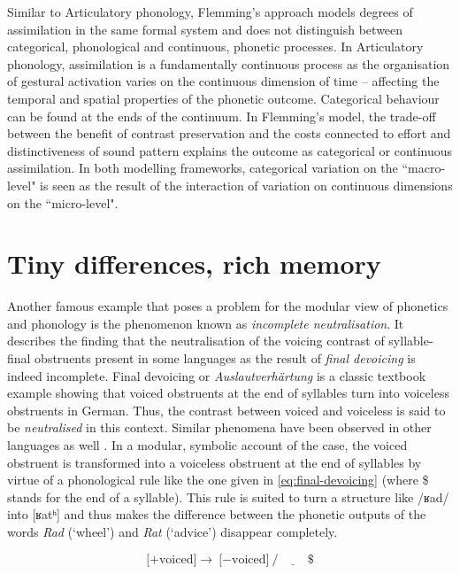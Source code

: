 Similar to Articulatory phonology, Flemming's approach models degrees of assimilation in the same formal system and does not distinguish between categorical, phonological and continuous, phonetic processes. In Articulatory phonology, assimilation is a fundamentally continuous process as the organisation of gestural activation varies on the continuous dimension of time -- affecting the temporal and spatial properties of the phonetic outcome. Categorical behaviour can be found at the ends of the continuum. In Flemming's model, the trade-off between the benefit of contrast preservation and the costs connected to effort and distinctiveness of sound pattern explains the outcome as categorical or continuous assimilation. In both modelling frameworks, categorical variation on the ``macro-level" is seen as the result of the interaction of variation on continuous dimensions on the ``micro-level".

\section{Tiny differences, rich memory}
Another famous example that poses a problem for the modular view of phonetics and phonology is the phenomenon known as \emph{incomplete neutralisation}. It describes the finding that the neutralisation of the voicing contrast of syllable-final obstruents present in some languages as the result of \emph{final devoicing} is indeed incomplete. Final devoicing or \emph{Auslautverhärtung} is a classic textbook example showing that voiced obstruents at the end of syllables turn into voiceless obstruents in German. Thus, the contrast between voiced and voiceless is said to be \emph{neutralised} in this context. Similar phenomena have been observed in other languages as well \citep{Bloomfield1933}. In a modular, symbolic account of the case, the voiced obstruent is transformed into a voiceless obstruent at the end of syllables by virtue of a phonological rule like the one given in \ref{eq:final-devoicing} (where \$ stands for the end of a syllable). This rule is suited to turn a structure like /ʁad/ into [ʁatʰ] and thus makes the difference between the phonetic outputs of the words \emph{Rad} (`wheel') and \emph{Rat} (`advice') disappear completely.

\begin{equation}
\text{[+voiced]} 
\rightarrow 
\text{[$-$voiced]}
/\underline{\hspace{1cm}}\$
\label{eq:final-devoicing}
\end{equation}


